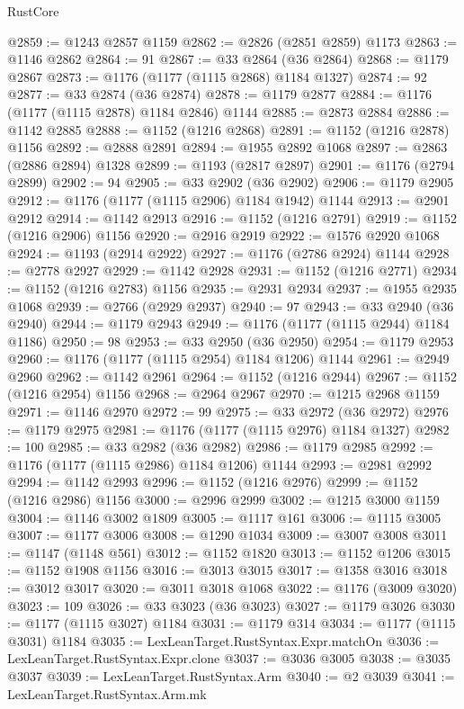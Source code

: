 \begin{lexlean}{RustCore}
\begin{coremodule}
@2859 := @1243 @2857 @1159
@2862 := @2826 (@2851 @2859) @1173
@2863 := @1146 @2862
@2864 := 91
@2867 := @33 @2864 (@36 @2864)
@2868 := @1179 @2867
@2873 := @1176 (@1177 (@1115 @2868) @1184 @1327)
@2874 := 92
@2877 := @33 @2874 (@36 @2874)
@2878 := @1179 @2877
@2884 := @1176 (@1177 (@1115 @2878) @1184 @2846) @1144
@2885 := @2873 @2884
@2886 := @1142 @2885
@2888 := @1152 (@1216 @2868)
@2891 := @1152 (@1216 @2878) @1156
@2892 := @2888 @2891
@2894 := @1955 @2892 @1068
@2897 := @2863 (@2886 @2894) @1328
@2899 := @1193 (@2817 @2897)
@2901 := @1176 (@2794 @2899)
@2902 := 94
@2905 := @33 @2902 (@36 @2902)
@2906 := @1179 @2905
@2912 := @1176 (@1177 (@1115 @2906) @1184 @1942) @1144
@2913 := @2901 @2912
@2914 := @1142 @2913
@2916 := @1152 (@1216 @2791)
@2919 := @1152 (@1216 @2906) @1156
@2920 := @2916 @2919
@2922 := @1576 @2920 @1068
@2924 := @1193 (@2914 @2922)
@2927 := @1176 (@2786 @2924) @1144
@2928 := @2778 @2927
@2929 := @1142 @2928
@2931 := @1152 (@1216 @2771)
@2934 := @1152 (@1216 @2783) @1156
@2935 := @2931 @2934
@2937 := @1955 @2935 @1068
@2939 := @2766 (@2929 @2937)
@2940 := 97
@2943 := @33 @2940 (@36 @2940)
@2944 := @1179 @2943
@2949 := @1176 (@1177 (@1115 @2944) @1184 @1186)
@2950 := 98
@2953 := @33 @2950 (@36 @2950)
@2954 := @1179 @2953
@2960 := @1176 (@1177 (@1115 @2954) @1184 @1206) @1144
@2961 := @2949 @2960
@2962 := @1142 @2961
@2964 := @1152 (@1216 @2944)
@2967 := @1152 (@1216 @2954) @1156
@2968 := @2964 @2967
@2970 := @1215 @2968 @1159
@2971 := @1146 @2970
@2972 := 99
@2975 := @33 @2972 (@36 @2972)
@2976 := @1179 @2975
@2981 := @1176 (@1177 (@1115 @2976) @1184 @1327)
@2982 := 100
@2985 := @33 @2982 (@36 @2982)
@2986 := @1179 @2985
@2992 := @1176 (@1177 (@1115 @2986) @1184 @1206) @1144
@2993 := @2981 @2992
@2994 := @1142 @2993
@2996 := @1152 (@1216 @2976)
@2999 := @1152 (@1216 @2986) @1156
@3000 := @2996 @2999
@3002 := @1215 @3000 @1159
@3004 := @1146 @3002 @1809
@3005 := @1117 @161
@3006 := @1115 @3005
@3007 := @1177 @3006
@3008 := @1290 @1034
@3009 := @3007 @3008
@3011 := @1147 (@1148 @561)
@3012 := @1152 @1820
@3013 := @1152 @1206
@3015 := @1152 @1908 @1156
@3016 := @3013 @3015
@3017 := @1358 @3016
@3018 := @3012 @3017
@3020 := @3011 @3018 @1068
@3022 := @1176 (@3009 @3020)
@3023 := 109
@3026 := @33 @3023 (@36 @3023)
@3027 := @1179 @3026
@3030 := @1177 (@1115 @3027) @1184
@3031 := @1179 @314
@3034 := @1177 (@1115 @3031) @1184
@3035 := LexLeanTarget.RustSyntax.Expr.matchOn
@3036 := LexLeanTarget.RustSyntax.Expr.clone
@3037 := @3036 @3005
@3038 := @3035 @3037
@3039 := LexLeanTarget.RustSyntax.Arm
@3040 := @2 @3039
@3041 := LexLeanTarget.RustSyntax.Arm.mk

\end{coremodule}
\end{lexlean}
